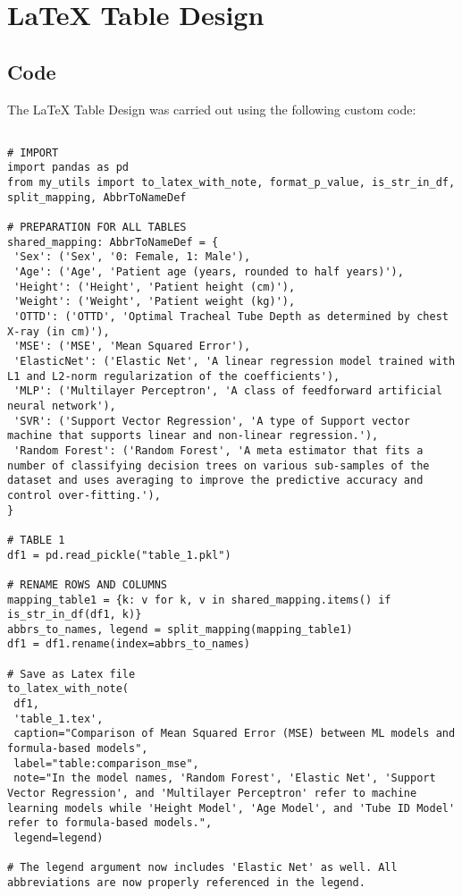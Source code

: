 \documentclass[11pt]{article}
\begin{document}
\section{LaTeX Table Design}
\subsection{{Code}}
The LaTeX Table Design was carried out using the following custom code:

\begin{verbatim}

# IMPORT
import pandas as pd
from my_utils import to_latex_with_note, format_p_value, is_str_in_df, split_mapping, AbbrToNameDef

# PREPARATION FOR ALL TABLES
shared_mapping: AbbrToNameDef = {
 'Sex': ('Sex', '0: Female, 1: Male'),
 'Age': ('Age', 'Patient age (years, rounded to half years)'),
 'Height': ('Height', 'Patient height (cm)'),
 'Weight': ('Weight', 'Patient weight (kg)'),
 'OTTD': ('OTTD', 'Optimal Tracheal Tube Depth as determined by chest X-ray (in cm)'),
 'MSE': ('MSE', 'Mean Squared Error'),
 'ElasticNet': ('Elastic Net', 'A linear regression model trained with L1 and L2-norm regularization of the coefficients'),
 'MLP': ('Multilayer Perceptron', 'A class of feedforward artificial neural network'),
 'SVR': ('Support Vector Regression', 'A type of Support vector machine that supports linear and non-linear regression.'),
 'Random Forest': ('Random Forest', 'A meta estimator that fits a number of classifying decision trees on various sub-samples of the dataset and uses averaging to improve the predictive accuracy and control over-fitting.'),
}

# TABLE 1
df1 = pd.read_pickle("table_1.pkl")

# RENAME ROWS AND COLUMNS
mapping_table1 = {k: v for k, v in shared_mapping.items() if is_str_in_df(df1, k)}
abbrs_to_names, legend = split_mapping(mapping_table1)
df1 = df1.rename(index=abbrs_to_names)

# Save as Latex file
to_latex_with_note(
 df1, 
 'table_1.tex', 
 caption="Comparison of Mean Squared Error (MSE) between ML models and formula-based models", 
 label="table:comparison_mse",
 note="In the model names, 'Random Forest', 'Elastic Net', 'Support Vector Regression', and 'Multilayer Perceptron' refer to machine learning models while 'Height Model', 'Age Model', and 'Tube ID Model' refer to formula-based models.",
 legend=legend)

# The legend argument now includes 'Elastic Net' as well. All abbreviations are now properly referenced in the legend.

\end{verbatim}
\end{document}
